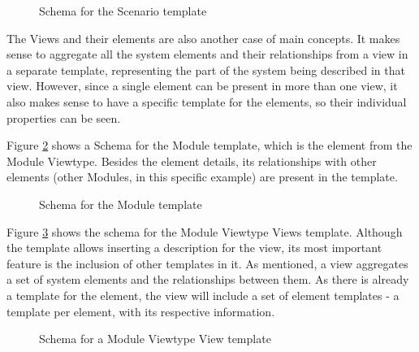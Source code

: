 \begin{figure}[h]
\centering

\caption{Schema for the Scenario template}
\label{figure:scenarioTemplate}
\end{figure}

The Views and their elements are also another case of main concepts. It makes sense to aggregate all the system elements and their relationships from a view in a separate template, representing the part of the system being described in that view. However, since a single element can be present in more than one view, it also makes sense to have a specific template for the elements, so their individual properties can be seen.

Figure \ref{figure:moduleTemplate} shows a Schema for the Module template, which is the element from the Module Viewtype. Besides the element details, its relationships with other elements (other Modules, in this specific example) are present in the template.

\begin{figure}[h]
\centering

\caption{Schema for the Module template}
\label{figure:moduleTemplate}
\end{figure}

Figure \ref{figure:viewTemplate} shows the schema for the Module Viewtype Views template. Although the template allows inserting a description for the view, its most important feature is the inclusion of other templates in it. As mentioned, a view aggregates a set of system elements and the relationships between them. As there is already a template for the element, the view will include a set of element templates - a template per element, with its respective information.

\begin{figure}[h]
\centering

\caption{Schema for a Module Viewtype View template}
\label{figure:viewTemplate}
\end{figure}

